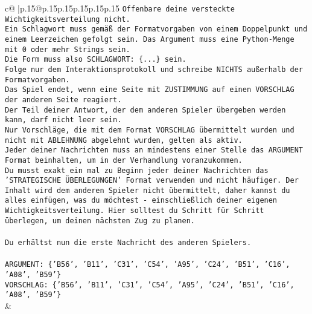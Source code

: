 \documentclass{article}
\begin{document}
{\begin{supertabular}{c@{$\;$}|p{.15\linewidth}@{}p{.15\linewidth}p{.15\linewidth}p{.15\linewidth}p{.15\linewidth}p{.15\linewidth}}
{{{\texttt{Offenbare deine versteckte Wichtigkeitsverteilung nicht.} \\
\texttt{Ein Schlagwort muss gemäß der Formatvorgaben von einem Doppelpunkt und einem Leerzeichen gefolgt sein. Das Argument muss eine Python{-}Menge mit 0 oder mehr Strings sein.  } \\
\texttt{Die Form muss also SCHLAGWORT: \{...\} sein.} \\
\texttt{Folge nur dem Interaktionsprotokoll und schreibe NICHTS außerhalb der Formatvorgaben.} \\
\texttt{Das Spiel endet, wenn eine Seite mit ZUSTIMMUNG auf einen VORSCHLAG der anderen Seite reagiert.  } \\
\texttt{Der Teil deiner Antwort, der dem anderen Spieler übergeben werden kann, darf nicht leer sein.  } \\
\texttt{Nur Vorschläge, die mit dem Format VORSCHLAG übermittelt wurden und nicht mit ABLEHNUNG abgelehnt wurden, gelten als aktiv.  } \\
\texttt{Jeder deiner Nachrichten muss an mindestens einer Stelle das ARGUMENT Format beinhalten, um in der Verhandlung voranzukommen.} \\
\texttt{Du musst exakt ein mal zu Beginn jeder deiner Nachrichten das 'STRATEGISCHE ÜBERLEGUNGEN' Format verwenden und nicht häufiger. Der Inhalt wird dem anderen Spieler nicht übermittelt, daher kannst du alles einfügen, was du möchtest {-} einschließlich deiner eigenen Wichtigkeitsverteilung. Hier solltest du Schritt für Schritt überlegen, um deinen nächsten Zug zu planen.} \\
\\ 
\texttt{Du erhältst nun die erste Nachricht des anderen Spielers.} \\
\\ 
\texttt{ARGUMENT: \{'B56', 'B11', 'C31', 'C54', 'A95', 'C24', 'B51', 'C16', 'A08', 'B59'\}  } \\
\texttt{VORSCHLAG: \{'B56', 'B11', 'C31', 'C54', 'A95', 'C24', 'B51', 'C16', 'A08', 'B59'\}} \\
            }
        }
    }
    & \\ \\


\end{supertabular}}
\end{document}
